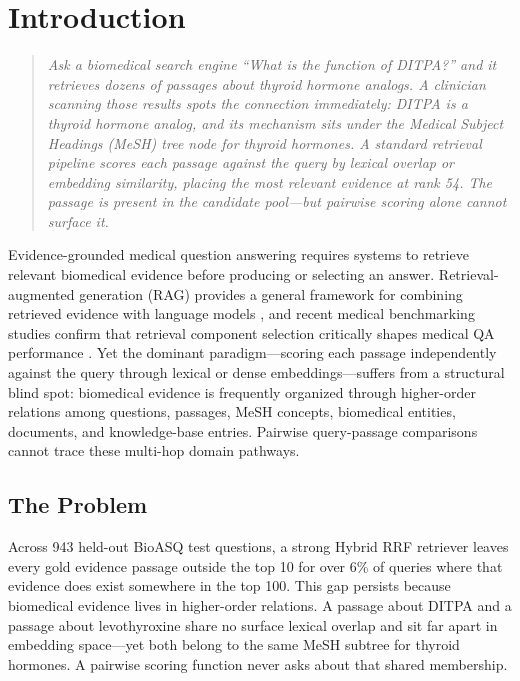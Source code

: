 \section{Introduction}

\begin{quote}
\small
\itshape
\noindent Ask a biomedical search engine ``What is the function of DITPA?'' and it retrieves dozens of passages about thyroid hormone analogs. A clinician scanning those results spots the connection immediately: DITPA is a thyroid hormone analog, and its mechanism sits under the Medical Subject Headings (MeSH) tree node for thyroid hormones. A standard retrieval pipeline scores each passage against the query by lexical overlap or embedding similarity, placing the most relevant evidence at rank 54. The passage is present in the candidate pool---but pairwise scoring alone cannot surface it.
\end{quote}

Evidence-grounded medical question answering requires systems to retrieve relevant biomedical evidence before producing or selecting an answer. Retrieval-augmented generation (RAG) provides a general framework for combining retrieved evidence with language models \citep{lewis2020rag}, and recent medical benchmarking studies confirm that retrieval component selection critically shapes medical QA performance \citep{xiong2024benchmarking}. Yet the dominant paradigm---scoring each passage independently against the query through lexical or dense embeddings---suffers from a structural blind spot: biomedical evidence is frequently organized through higher-order relations among questions, passages, MeSH concepts, biomedical entities, documents, and knowledge-base entries. Pairwise query-passage comparisons cannot trace these multi-hop domain pathways.

\subsection*{The Problem}

Across 943 held-out BioASQ test questions, a strong Hybrid RRF retriever leaves every gold evidence passage outside the top 10 for over 6\% of queries where that evidence does exist somewhere in the top 100. This gap persists because biomedical evidence lives in higher-order relations. A passage about DITPA and a passage about levothyroxine share no surface lexical overlap and sit far apart in embedding space---yet both belong to the same MeSH subtree for thyroid hormones. A pairwise scoring function never asks about that shared membership.

